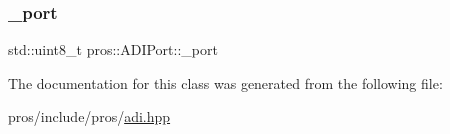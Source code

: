 \subsubsection{\texorpdfstring{\+\_\+port}{\_port}}
{\footnotesize\ttfamily std\+::uint8\+\_\+t pros\+::\+A\+D\+I\+Port\+::\+\_\+port\hspace{0.3cm}{\ttfamily [protected]}}



The documentation for this class was generated from the following file\+:\begin{DoxyCompactItemize}
\item 
pros/include/pros/\hyperlink{adi_8hpp}{adi.\+hpp}\end{DoxyCompactItemize}
